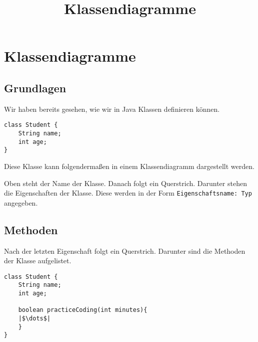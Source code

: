 \documentclass[a4paper]{scrartcl}
\date{}
\title{Klassendiagramme}
\begin{document}
\section*{Klassendiagramme}
\subsection*{Grundlagen}

Wir haben bereits gesehen, wie wir in Java Klassen definieren können.

\begin{verbatim}
class Student {
    String name;
    int age;
}
\end{verbatim}
\noindent
Diese Klasse kann folgendermaßen in einem Klassendiagramm dargestellt werden.
\begin{center}
\end{center}
Oben steht der Name der Klasse. Danach folgt ein Querstrich. Darunter stehen
die Eigenschaften der Klasse. Diese werden in der Form \texttt{Eigenschaftsname: Typ} angegeben.



\subsection*{Methoden}

Nach der letzten Eigenschaft folgt ein Querstrich. Darunter sind die Methoden der Klasse aufgelistet.


\begin{verbatim}
class Student {
    String name;
    int age;

    boolean practiceCoding(int minutes){
	|$\dots$|
    }
}
\end{verbatim}





\begin{center}
\end{center}
\end{document}
